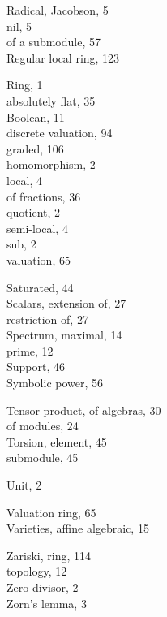 {\begin{minipage}[t]{0.46\textwidth}
\medskip
Radical, Jacobson, 5\\
\hspace*{1.5em}nil, 5\\
\hspace*{1.5em}of a submodule, 57\\
Regular local ring, 123
\end{minipage}\hfill
\begin{minipage}[t]{0.46\textwidth}
Ring, 1\\
\hspace*{1.5em}absolutely flat, 35\\
\hspace*{1.5em}Boolean, 11\\
\hspace*{1.5em}discrete valuation, 94\\
\hspace*{1.5em}graded, 106\\
\hspace*{1.5em}homomorphism, 2\\
\hspace*{1.5em}local, 4\\
\hspace*{1.5em}of fractions, 36\\
\hspace*{1.5em}quotient, 2\\
\hspace*{1.5em}semi-local, 4\\
\hspace*{1.5em}sub, 2\\
\hspace*{1.5em}valuation, 65

\medskip
Saturated, 44\\
Scalars, extension of, 27\\
\hspace*{1.5em}restriction of, 27\\
Spectrum, maximal, 14\\
\hspace*{1.5em}prime, 12\\
Support, 46\\
Symbolic power, 56

\medskip
Tensor product, of algebras, 30\\
\hspace*{1.5em}of modules, 24\\
Torsion, element, 45\\
\hspace*{1.5em}submodule, 45

\medskip
Unit, 2

\medskip
Valuation ring, 65\\
Varieties, affine algebraic, 15

\medskip
Zariski, ring, 114\\
\hspace*{1.5em}topology, 12\\
Zero-divisor, 2\\
Zorn's lemma, 3
\end{minipage}
}
